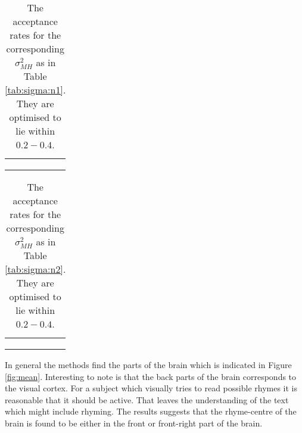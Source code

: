 \documentclass[a4paper,english]{article}
\begin{document}
\begin{table}
  \centering
  \begin{tabular}{c c c}
     &  &  \\
     &  &  \\
     &  &  \\
  \end{tabular}
  \caption{The acceptance rates for the corresponding $\sigma_{MH}^2$ as in Table \ref{tab:sigma:n1}. They are optimised to lie within $0.2 - 0.4$.}
  \label{tab:acceptance:n1}
\end{table}

\begin{table}
  \centering
  \begin{tabular}{c c c}
     &  &  \\
     &  &  \\
     &  &  \\
  \end{tabular}
  \caption{The acceptance rates for the corresponding $\sigma_{MH}^2$ as in Table \ref{tab:sigma:n2}. They are optimised to lie within $0.2 - 0.4$.}
  \label{tab:acceptance:n2}
\end{table}


In general the methods find the parts of the brain which is indicated in Figure \ref{fig:mean}.
Interesting to note is that the back parts of the brain corresponds to the visual cortex.
For a subject which visually tries to read possible rhymes it is reasonable that it should be active.
That leaves the understanding of the text which might include rhyming.
The results suggests that the rhyme-centre of the brain is found to be either in the front or front-right part of the brain.
\end{document}
